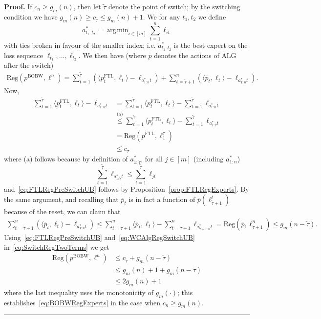 \documentclass[11pt,letter]{article}
\newenvironment{proof}[1][Proof]{\noindent\textbf{#1.} }{\ \rule{0.5em}{0.5em}}
\newcommand{\Reg}{\mathrm{Reg}}
\newcommand{\pftl}{p^{\mathrm{FTL}}}
\newcommand{\pwc}{\overline{p}}
\newcommand{\wcalg}{\overline{\text{ALG}}}
\newcommand{\pbobw}{p^{\mathrm{BOBW}}}
\newcommand{\ttil}{\widetilde{\tau}}
\DeclareMathOperator*{\argmin}{\arg\!\min}
\begin{document}
\begin{proof}
    If $c_n \ge g_m(n)$, then let $\ttil$ denote the point of switch; by the switching condition we have $g_m(n) \ge c_{\ttil} \le g_m(n)+1$. We for any $t_1,t_2$ we define 
    \[
    a^*_{t_1:t_2} = \argmin_{i \in [m]} \sum_{t=1}^n \ell_{it} 
    \]
    with ties broken in favour of the smaller index; i.e. $a^*_{t_1:t_2}$ is the best expert on the loss sequence $\ell_{t_1},\dotsc,\ell_{t_2}$. We then have (where $\pwc$ denotes the actions of $\wcalg$ after the switch)
    \begin{align} \label{eq:SwitchRegTwoTerms}
        \Reg(\pbobw, \ell^n) = \sum_{t=1}^{\ttil} \left( \langle \pftl_t,\ell_t \rangle  - \ell_{a^*_{1:n}t}\right) + \sum_{t=\ttil+1}^{n} \left( \langle \pwc_t,\ell_t \rangle - \ell_{a^*_{1:n}t} \right). 
    \end{align}
    Now,
    \begin{align}
       \sum_{t=1}^{\ttil} \langle \pftl_t,\ell_t \rangle  - \ell_{a^*_{1:n}t} &= \sum_{t=1}^{\ttil} \langle \pftl_t,\ell_t \rangle - \sum_{t=1}^{\ttil} \ell_{a^*_{1:n}t} \nonumber\\
       &\stackrel{\text{(a)}}{\le}  \sum_{t=1}^{\ttil} \langle \pftl_t,\ell_t \rangle - \sum_{t=1}^{\ttil} \ell_{a^*_{1:\ttil}t} \nonumber\\
       &= \Reg(\pftl,\ell_1^{\ttil}) \nonumber\\
       &\le c_{\ttil}  \label{eq:FTLRegPreSwitchUB}
    \end{align}
    where (a) follows because by definition of $a^*_{1:\ttil}$, for all $j \in [m]$ (including $a^*_{1:n}$) 
    \[
    \sum_{t=1}^{\ttil} \ell_{a^*_{1:\ttil}t}  \le \sum_{t=1}^{\ttil} \ell_{jt}
    \]
    and~\eqref{eq:FTLRegPreSwitchUB} follows by Proposition~\ref{prop:FTLRegExperts}.
    By the same argument, and recalling that $\pwc_t$ is in fact a function of $\pwc(\ell_{\ttil+1}^t)$ because of the reset, we can claim that 
    \begin{align} \label{eq:WCAlgRegSwitchUB}
        \sum_{t=\ttil+1}^{n} \left( \langle \pwc_t,\ell_t \rangle - \ell_{a^*_{1:n}t} \right) \le  \sum_{t=\ttil+1}^{n} \langle \pwc_t,\ell_t \rangle - \sum_{t=\ttil+1}^{n} \ell_{a^*_{\ttil+1:n}t} = \Reg(\pwc, \ell_{\ttil+1}^n) \le g_m(n-\ttil).
    \end{align}
    Using~\eqref{eq:FTLRegPreSwitchUB} and~\eqref{eq:WCAlgRegSwitchUB} in~\eqref{eq:SwitchRegTwoTerms} we get 
    \begin{align*}
        \Reg(\pbobw, \ell^n)  &\le c_{\ttil} + g_m(n-\ttil) \\
        &\le g_m(n) + 1 + g_m(n-\ttil) \\
        &\le 2g_m(n) + 1
    \end{align*}
   where the last inequality uses the monotonicity of $g_m(\cdot)$; this establishes~\eqref{eq:BOBWRegExperts} in the case when $c_n \ge g_m(n)$.
\end{proof}
\end{document}
